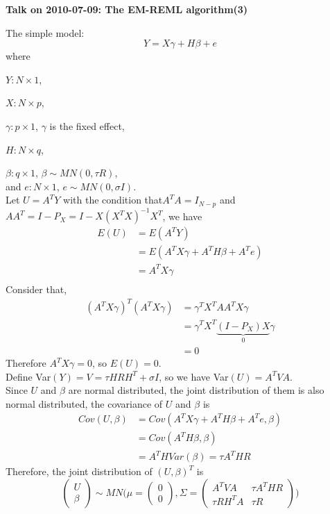 \documentclass[12pt]{article}
\begin{document}
    \begin{center}
        {\bf Talk on 2010-07-09: The EM-REML algorithm(3)}
    \end{center}
    The simple model:
    \begin{equation*}
        Y=X\gamma+H\beta+e
    \end{equation*}
    where

    $Y:N\times 1$,

    $X:N\times p$,

    $\gamma:p\times 1$, $\gamma$ is the fixed effect,

    $H:N\times q$,

    $\beta:q\times 1$, $\beta\sim MN(0,\tau R)$, \\
    and $e:N\times1$, $e\sim MN(0,\sigma I)$.\\
    Let $U=A^TY$ with the condition that$A^TA=I_{N-p}$ and $AA^T=I-P_X=I-X(X^TX)^{-1}X^T$, we have
    \begin{align*}
        E(U)&=E(A^TY)\\
        &=E(A^TX\gamma+A^TH\beta+A^Te)\\
        &=A^TX\gamma\\
    \end{align*}
    Consider that,
    \begin{align*}
        (A^TX\gamma)^T(A^TX\gamma)&=\gamma^TX^TAA^TX\gamma\\
        &=\gamma^TX^T\underbrace{(I-P_X)X}_{0}\gamma\\
        &=0
    \end{align*}
    Therefore $A^TX\gamma=0$, so $E(U)=0$.\\
    Define Var$(Y)=V=\tau HRH^T+\sigma I$, so we have Var$(U)=A^TVA$.\\
    Since $U$ and $\beta$ are normal distributed, the joint distribution of them is also normal distributed, the covariance of $U$ and $\beta$ is
     \begin{equation*}
     \begin{split}
        Cov(U,\beta)&=Cov(A^TX\gamma+A^TH\beta+A^Te,\beta)\\
        &=Cov(A^TH\beta,\beta)\\
        &=A^THVar(\beta)=\tau A^THR
     \end{split}
    \end{equation*}
    Therefore, the joint distribution of $(U,\beta)^T$ is
    \begin{equation*}
    \begin{pmatrix}
    U\\
    \beta
    \end{pmatrix}
    \sim MN\Big( \mu=\begin{pmatrix}
    0\\
    0
    \end{pmatrix}
    ,\Sigma=\begin{pmatrix}
    A^TVA&\tau A^THR\\
    \tau RH^TA&\tau R
    \end{pmatrix}
    \Big)
    \end{equation*}
\end{document}
